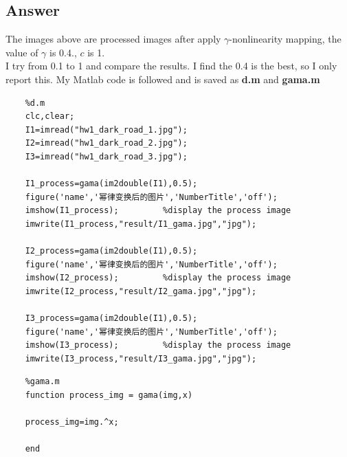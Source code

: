 \documentclass[
	12pt, %
]{fphw}
\begin{document}
\subsection*{Answer}
The images above are processed images after apply $\gamma$-nonlinearity mapping, the value of $\gamma$ is 0.4., $c$ is 1.\\
I try from 0.1 to 1 and compare the results. I find the 0.4 is the best, so I only report this.
My Matlab code is followed and is saved as \textbf{d.m} and \textbf{gama.m}
\begin{lstlisting}
	%d.m
	clc,clear;
	I1=imread("hw1_dark_road_1.jpg");
	I2=imread("hw1_dark_road_2.jpg");
	I3=imread("hw1_dark_road_3.jpg");

	I1_process=gama(im2double(I1),0.5);
	figure('name','幂律变换后的图片','NumberTitle','off');
	imshow(I1_process);         %display the process image
	imwrite(I1_process,"result/I1_gama.jpg","jpg");

	I2_process=gama(im2double(I1),0.5);
	figure('name','幂律变换后的图片','NumberTitle','off');
	imshow(I2_process);         %display the process image
	imwrite(I2_process,"result/I2_gama.jpg","jpg");

	I3_process=gama(im2double(I1),0.5);
	figure('name','幂律变换后的图片','NumberTitle','off');
	imshow(I3_process);         %display the process image
	imwrite(I3_process,"result/I3_gama.jpg","jpg");
\end{lstlisting}
\begin{lstlisting}
	%gama.m
	function process_img = gama(img,x)
    
    process_img=img.^x;

	end
\end{lstlisting}
\end{document}
